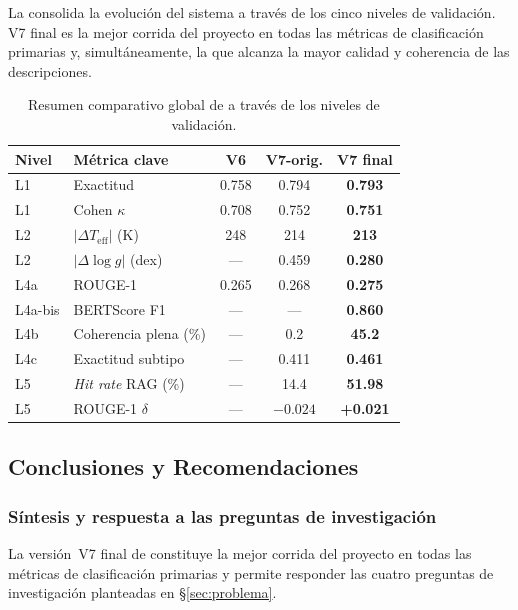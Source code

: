 La  consolida la evolución del sistema a través de los
cinco niveles de validación. V7 final es la mejor corrida del proyecto en todas
las métricas de clasificación primarias y, simultáneamente, la que alcanza la
mayor calidad y coherencia de las descripciones.

\begin{table}[H]
  \centering
  \caption{Resumen comparativo global de \STELLAR{} a través de los niveles de
  validación.}
  \label{tab:resumen-global}
  \begin{tabular}{llccc}
    \toprule
    Nivel & Métrica clave & V6 & V7-orig. & \textbf{V7 final} \\
    \midrule
    L1     & Exactitud           & 0.758 & 0.794 & \textbf{0.793} \\
    L1     & Cohen $\kappa$      & 0.708 & 0.752 & \textbf{0.751} \\
    L2     & $|\Delta T_\mathrm{eff}|$ (K) & 248 & 214 & \textbf{213} \\
    L2     & $|\Delta\log g|$ (dex) & ---  & 0.459 & \textbf{0.280} \\
    L4a    & ROUGE-1             & 0.265 & 0.268 & \textbf{0.275} \\
    L4a-bis& BERTScore F1        & ---   & ---   & \textbf{0.860} \\
    L4b    & Coherencia plena (\%) & --- & 0.2   & \textbf{45.2} \\
    L4c    & Exactitud subtipo   & ---   & 0.411 & \textbf{0.461} \\
    L5     & \emph{Hit rate} RAG (\%) & --- & 14.4 & \textbf{51.98} \\
    L5     & ROUGE-1 $\delta$    & ---   & $-0.024$ & \textbf{+0.021} \\
    \bottomrule
  \end{tabular}
\end{table}

\subsection{Conclusiones y Recomendaciones}
\label{sec:conclusiones}

\subsubsection{Síntesis y respuesta a las preguntas de investigación}
\label{sec:concl-sintesis}

La versión~V7 final de \STELLAR{} constituye la mejor corrida del proyecto en
todas las métricas de clasificación primarias y permite responder las cuatro
preguntas de investigación planteadas en §\ref{sec:problema}.

